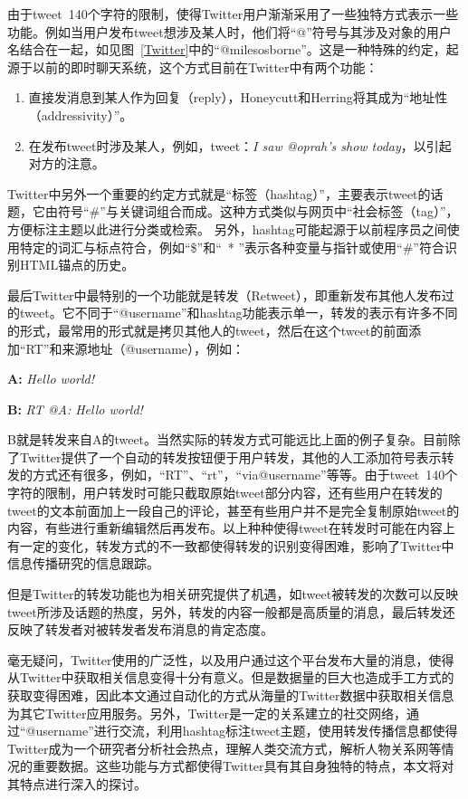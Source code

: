 由于tweet~140个字符的限制，使得Twitter用户渐渐采用了一些独特方式表示一些功能。例如当用户发布tweet想涉及某人时，他们将“@”符号与其涉及对象的用户名结合在一起，如见图~\ref{Twitter}中的“@milesosborne”。这是一种特殊的约定，起源于以前的即时聊天系统，这个方式目前在Twitter中有两个功能：
   \begin{enumerate}
    \item 直接发消息到某人作为回复（reply），Honeycutt和Herring将其成为“地址性（addressivity）”。
    \item 在发布tweet时涉及某人，例如，tweet：\emph{I saw @oprah's show today}，以引起对方的注意。
  \end{enumerate}  

Twitter中另外一个重要的约定方式就是“标签（hashtag）”，主要表示tweet的话题，它由符号“\#”与关键词组合而成。这种方式类似与网页中“社会标签（tag）”，方便标注主题以此进行分类或检索。 另外，hashtag可能起源于以前程序员之间使用特定的词汇与标点符合，例如“\$”和“\ * ”表示各种变量与指针或使用“\#”符合识别HTML锚点的历史。

最后Twitter中最特别的一个功能就是转发（Retweet），即重新发布其他人发布过的tweet。它不同于“@username”和hashtag功能表示单一，转发的表示有许多不同的形式，最常用的形式就是拷贝其他人的tweet，然后在这个tweet的前面添加“RT”和来源地址（@username），例如：
 \begin{description}
    \item \textbf{A:} \emph{Hello world!}
    \item \textbf{B:} \emph{RT @A: Hello world!}
  \end{description}  
B就是转发来自A的tweet。当然实际的转发方式可能远比上面的例子复杂。目前除了Twitter提供了一个自动的转发按钮便于用户转发，其他的人工添加符号表示转发的方式还有很多，例如，“RT”、“rt”，“via@username”等等。由于tweet~140个字符的限制，用户转发时可能只截取原始tweet部分内容，还有些用户在转发的tweet的文本前面加上一段自己的评论，甚至有些用户并不是完全复制原始tweet的内容，有些进行重新编辑然后再发布。以上种种使得tweet在转发时可能在内容上有一定的变化，转发方式的不一致都使得转发的识别变得困难，影响了Twitter中信息传播研究的信息跟踪。

但是Twitter的转发功能也为相关研究提供了机遇，如tweet被转发的次数可以反映tweet所涉及话题的热度，另外，转发的内容一般都是高质量的消息，最后转发还反映了转发者对被转发者发布消息的肯定态度。

毫无疑问，Twitter使用的广泛性，以及用户通过这个平台发布大量的消息，使得从Twitter中获取相关信息变得十分有意义。但是数据量的巨大也造成手工方式的获取变得困难，因此本文通过自动化的方式从海量的Twitter数据中获取相关信息为其它Twitter应用服务。另外，Twitter是一定的关系建立的社交网络，通过“@username”进行交流，利用hashtag标注tweet主题，使用转发传播信息都使得Twitter成为一个研究者分析社会热点，理解人类交流方式，解析人物关系网等情况的重要数据。这些功能与方式都使得Twitter具有其自身独特的特点，本文将对其特点进行深入的探讨。

